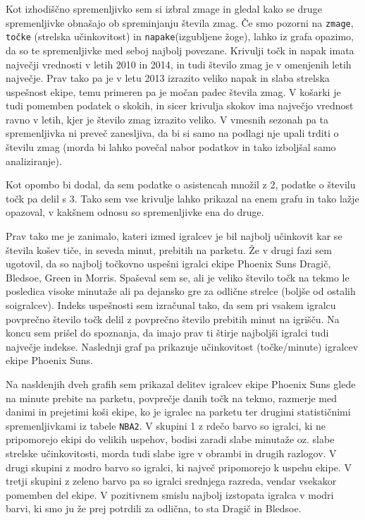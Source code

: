 \documentclass[11pt,a4paper]{article}
\begin{document}
\newpage
Kot izhodiščno spremenljivko sem si izbral zmage in gledal kako se druge spremenljivke obnašajo ob spreminjanju števila zmag. Če smo pozorni na \verb|zmage|, \verb|točke| (strelska učinkovitost) in \verb|napake|(izgubljene žoge), lahko iz grafa opazimo, da so te spremenljivke med seboj najbolj povezane. Krivulji točk in napak imata največji vrednosti v letih 2010 in 2014, in tudi število zmag je v omenjenih letih največje. Prav tako pa je v letu 2013 izrazito veliko napak in slaba strelska uspešnost ekipe, temu primeren pa je močan padec števila zmag. V košarki je tudi pomemben podatek o skokih, in sicer krivulja skokov ima največjo vrednost ravno v letih, kjer je število zmag izrazito veliko. V vmesnih sezonah pa ta spremenljivka ni preveč zanesljiva, da bi si samo na podlagi nje upali trditi o številu zmag (morda bi lahko povečal nabor podatkov in tako izboljšal samo analiziranje).
\smallskip

Kot opombo bi dodal, da sem podatke o asistencah množil z 2, podatke o številu točk pa delil s 3. Tako sem vse krivulje lahko prikazal na enem grafu in tako lažje opazoval, v kakšnem odnosu so spremenljivke ena do druge.

\medskip

Prav tako me je zanimalo, kateri izmed igralcev je bil najbolj učinkovit kar se števila košev tiče, in seveda minut, prebitih na parketu. Že v drugi fazi sem ugotovil, da so najbolj točkovno uspešni igralci ekipe Phoenix Suns Dragič, Bledsoe, Green in Morris. Spaševal sem se, ali je veliko število točk na tekmo le posledica visoke minutaže ali pa dejansko gre za odlične strelce (boljše od ostalih soigralcev). Indeks uspešnosti sem izračunal tako, da sem pri vsakem igralcu povprečno število točk delil z povprečno število prebitih minut na igrišču. Na koncu sem prišel do spoznanja, da imajo prav ti štirje najboljši igralci tudi največje indekse. Naslednji graf pa prikazuje učinkovitost (točke/minute) igralcev ekipe Phoenix Suns.
\medskip


Na nasldenjih dveh grafih sem prikazal delitev igralcev ekipe Phoenix Suns glede na minute prebite na parketu, povprečje danih točk na tekmo, razmerje med danimi in prejetimi koši ekipe, ko je igralec na parketu ter drugimi statističnimi spremenljivkami iz tabele \verb|NBA2|. V skupini 1 z rdečo barvo so igralci, ki ne pripomorejo ekipi do velikih uspehov, bodisi zaradi slabe minutaže oz. slabe strelske učinkovitosti, morda tudi slabe igre v obrambi in drugih razlogov. V drugi skupini z modro barvo so igralci, ki največ pripomorejo k uspehu ekipe. V tretji skupini z zeleno barvo pa so igralci srednjega razreda, vendar vsekakor pomemben del ekipe. V pozitivnem smislu najbolj izstopata igralca v modri barvi, ki smo ju že prej potrdili za odlična, to sta Dragič in Bledsoe.
\end{document}
